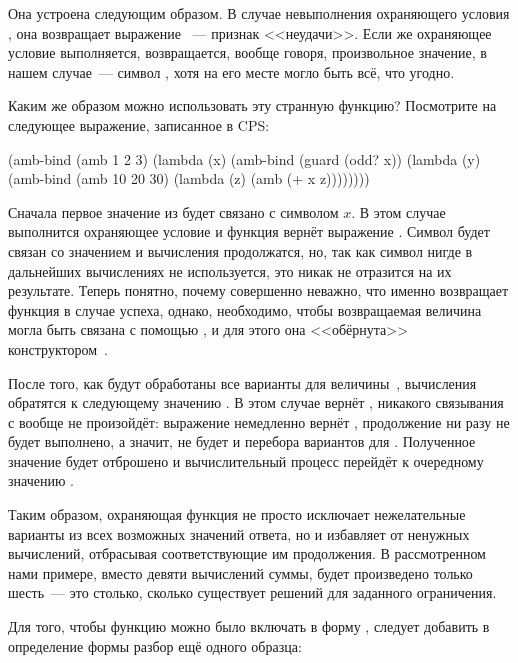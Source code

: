 Она устроена следующим образом. В случае невыполнения охраняющего условия , она возвращает  выражение ~--- признак <<неудачи>>. Если же охраняющее условие выполняется, возвращается, вообще говоря, произвольное значение, в нашем случае~--- символ , хотя на его месте могло быть всё, что угодно.

Каким же образом можно использовать эту странную функцию? Посмотрите на следующее выражение, записанное в CPS:

\begin{SchemeCode}[emph={x,y,z}]
(amb-bind (amb 1 2 3) 
          (lambda (x) 
            (amb-bind (guard (odd? x))
                      (lambda (y) 
                        (amb-bind (amb 10 20 30)
                                  (lambda (z) (amb (+ x z))))))))
\end{SchemeCode}

Сначала первое значение из  будет связано с символом $x$. В этом случае выполнится охраняющее условие и функция  вернёт выражение . Символ  будет связан со значением  и вычисления продолжатся, но, так как символ  нигде в дальнейших вычислениях не используется, это никак не отразится на их результате.  Теперь понятно, почему совершенно неважно, что именно возвращает функция  в случае успеха, однако, необходимо, чтобы возвращаемая величина могла быть связана с помощью , и для этого она <<обёрнута>> конструктором~.

После того, как будут обработаны все варианты для величины~, вычисления обратятся к следующему значению . В этом случае  вернёт , никакого связывания с  вообще не произойдёт: выражение  немедленно вернёт , продолжение  ни разу не будет выполнено, а значит, не будет и перебора вариантов для . Полученное значение  будет отброшено и вычислительный процесс перейдёт к очередному значению .

Таким образом, охраняющая функция  не просто исключает нежелательные варианты из всех возможных значений ответа, но и избавляет от ненужных вычислений, отбрасывая соответствующие им продолжения. В рассмотренном нами примере, вместо девяти вычислений суммы, будет произведено только шесть~--- это столько, сколько существует решений для заданного ограничения.

Для того, чтобы функцию  можно было включать в форму , следует добавить в определение формы разбор ещё одного образца:

